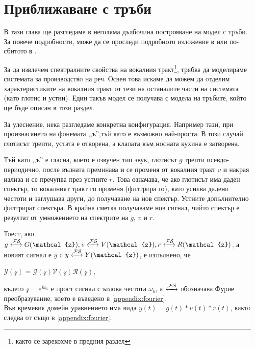 \documentclass[main.tex]{subfiles}
\begin{document}
\section{Приближаване с тръби}
\label{tubes}
В тази глава ще разгледаме в неголяма дълбочина построяване на модел с тръби. За повече подробности, може да се проследи подробното изложение в \cite{rabiner_schafer78} или по-сбитото в \cite{taylor:2009}.

За да извлечем спектралните свойства на вокалния тракт\footnote{както се зарекохме в предния раздел}, трябва да моделираме системата за производство на реч. Освен това искаме да можем да отделим характеристиките на вокалния тракт от тези на останалите части на системата (като глотис и устни). Един такъв модел се получава с модела на тръбите, който ще бъде описан в този раздел.

За улеснение, нека разгледаме конкретна конфигурация. Например тази, при произнасянето на фонемата ,,ъ'',тъй като е възможно най-проста. В този случай глотисът трепти, устата е отворена, а клапата към носната кухина е затворена.

Тъй като ,,ъ'' е гласна, което е озвучен тип звук, глотисът $g$ трепти псевдо-периодично, после вълната преминава и се променя от вокалния тракт $v$ и накрая излиза и се пречупва през устните $r$. Това означава, че ако глотисът има даден спектър, то вокалният тракт го променя (филтрира го), като усилва дадени честоти и заглушава други, до получаване на нов спектър. Устните допълнително филтрират спектъра. В крайна сметка получаваме нов сигнал, чийто спектър е резултат от умножението на спектрите на $g$, $v$ и $r$.

Тоест, ако $g \xleftrightarrow{\mathcal{F}\mathcal{S}} G(\mathcal{z}), v \xleftrightarrow{\mathcal{F}\mathcal{S}} V(\mathcal{z}), r \xleftrightarrow{\mathcal{F}\mathcal{S}} R(\mathcal{z})$, а новият сигнал е $y$ с $y \xleftrightarrow{\mathcal{F}\mathcal{S}} Y(\mathcal{z})$, е изпълнено, че

$\mathcal{Y}(\mathcal{z}) = \mathcal{G}(\mathcal{z}) \mathcal{V}(\mathcal{z}) \mathcal{R}(\mathcal{z})$,

където $\mathcal{z} = e^{i\omega_k}$ е прост сигнал с ъглова честота $\omega_k$, а $\xleftrightarrow{\mathcal{F}\mathcal{S}}$ обозначава Фурие преобразувание, което е въведено в \autoref{appendix:fourier}.\\

Във времевия домейн уравнението има вида $y(t) = g(t)\ast v(t)\ast r(t)$, както следва от  също в \autoref{appendix:fourier}.
\end{document}
